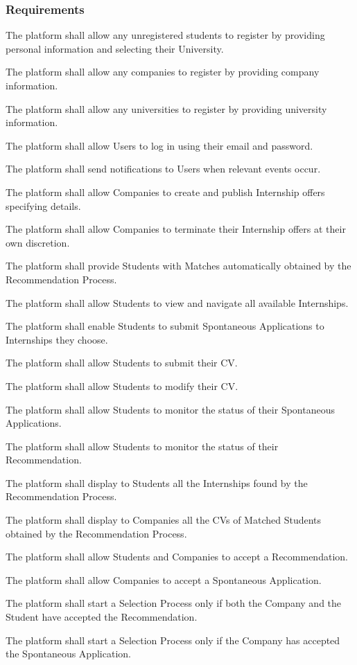 \subsubsection{Requirements}
\begin{enumerate}[label={\color{titleColor}[R\arabic*]}]
    \item The platform shall allow any unregistered students to register by providing personal information and selecting their University.
    \item The platform shall allow any companies to register by providing company information.
    \item The platform shall allow any universities to register by providing university information.
    \item The platform shall allow Users to log in using their email and password.
    \item The platform shall send notifications to Users when relevant events occur.
    
    \item The platform shall allow Companies to create and publish Internship offers specifying details.
    \item The platform shall allow Companies to terminate their Internship offers at their own discretion.
    \item The platform shall provide Students with Matches automatically obtained by the Recommendation Process.
    \item The platform shall allow Students to view and navigate all available Internships.
    \item The platform shall enable Students to submit Spontaneous Applications to Internships they choose.
    \item The platform shall allow Students to submit their CV.
    \item The platform shall allow Students to modify their CV.
    \item The platform shall allow Students to monitor the status of their Spontaneous Applications.
    \item The platform shall allow Students to monitor the status of their Recommendation.
    
    \item The platform shall display to Students all the Internships found by the Recommendation Process.
    \item The platform shall display to Companies all the CVs of Matched Students obtained by the Recommendation Process.
    \item The platform shall allow Students and Companies to accept a Recommendation.
    \item The platform shall allow Companies to accept a Spontaneous Application.
    \item The platform shall start a Selection Process only if both the Company and the Student have accepted the Recommendation.
    \item The platform shall start a Selection Process only if the Company has accepted the Spontaneous Application.
    

\end{enumerate}
